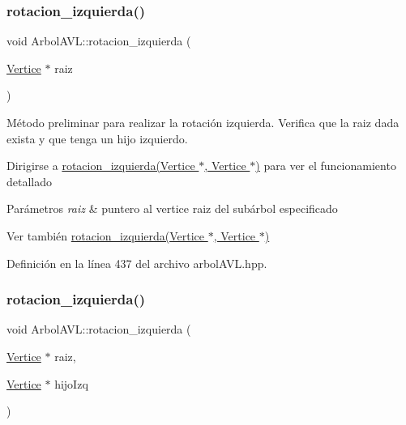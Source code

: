 \subsubsection{\texorpdfstring{rotacion\+\_\+izquierda()}{rotacion\_izquierda()}\hspace{0.1cm}{\footnotesize\ttfamily [1/2]}}
{\footnotesize\ttfamily void Arbol\+A\+V\+L\+::rotacion\+\_\+izquierda (\begin{DoxyParamCaption}\item[{\hyperlink{classVertice}{Vertice} $\ast$}]{raiz }\end{DoxyParamCaption})}



Método preliminar para realizar la rotación izquierda. Verifica que la raiz dada exista y que tenga un hijo izquierdo. 

Dirigirse a \hyperlink{classArbolAVL_abfaf2247b607b040e328391ec8621546}{rotacion\+\_\+izquierda(\+Vertice $\ast$, Vertice $\ast$)} para ver el funcionamiento detallado 
\begin{DoxyParams}{Parámetros}
{\em raiz} & puntero al vertice raiz del subárbol especificado \\
\hline
\end{DoxyParams}
\begin{DoxySeeAlso}{Ver también}
\hyperlink{classArbolAVL_abfaf2247b607b040e328391ec8621546}{rotacion\+\_\+izquierda(\+Vertice $\ast$, Vertice $\ast$)} 
\end{DoxySeeAlso}


Definición en la línea 437 del archivo arbol\+A\+V\+L.\+hpp.

\mbox{\label{classArbolAVL_abfaf2247b607b040e328391ec8621546}} 
\subsubsection{\texorpdfstring{rotacion\+\_\+izquierda()}{rotacion\_izquierda()}\hspace{0.1cm}{\footnotesize\ttfamily [2/2]}}
{\footnotesize\ttfamily void Arbol\+A\+V\+L\+::rotacion\+\_\+izquierda (\begin{DoxyParamCaption}\item[{\hyperlink{classVertice}{Vertice} $\ast$}]{raiz,  }\item[{\hyperlink{classVertice}{Vertice} $\ast$}]{hijo\+Izq }\end{DoxyParamCaption})}



